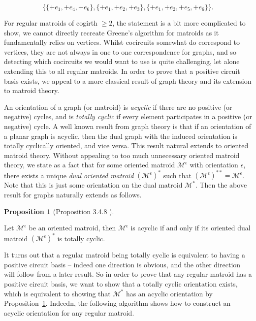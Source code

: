 \documentclass[12pt]{report}
\theoremstyle{definition}
\newtheorem{proposition}[theorem]{Proposition}
\def\calM{\mathcal M}
\theoremstyle{upright}
\begin{document}
\[\{\{+e_1, +e_4, +e_6\}, \{+e_1, +e_2, +e_3\}, \{+e_1, +e_2, +e_5, +e_6\}\}.\]

For regular matroids of cogirth $\geq2$, the statement is a bit more complicated to show, we cannot directly recreate Greene's algorithm for matroids as it fundamentally relies on vertices.
Whilst cocircuits somewhat do correspond to vertices, they are not always in one to one correspondence for graphs, and so detecting which cocircuits we would want to use is quite challenging, let alone extending this to all regular matroids.
In order to prove that a positive circuit basis exists, we appeal to a more classical result of graph theory and its extension to matroid theory.

An orientation of a graph (or matroid) is \textit{acyclic} if there are no positive (or negative) cycles, and is \textit{totally cyclic} if every element participates in a positive (or negative) cycle.
A well known result from graph theory is that if an orientation of a planar graph is acyclic, then the dual graph with the induced orientation is totally cyclically oriented, and vice versa.
This result natural extends to oriented matroid theory.
Without appealing to too much unnecessary oriented matroid theory, we state as a fact that for some oriented matroid $\calM^\epsilon$ with orientation $\epsilon$, there exists a unique \textit{dual oriented matroid} $(\calM^\epsilon)^*$ such that $(\calM^\epsilon)^{**}=\calM^\epsilon$.
Note that this is just some orientation on the dual matroid $\calM^*$.
Then the above result for graphs naturally extends as follows.

\begin{proposition}[Proposition 3.4.8 \cite{bjorner1999oriented}]\label{prop:DualCyclic}

    Let $\calM^\epsilon$ be an oriented matroid, then $\calM^\epsilon$ is acyclic if and only if its oriented dual matroid $\left(\calM^\epsilon\right)^*$ is totally cyclic.
    
\end{proposition}

It turns out that a regular matroid being totally cyclic is equivalent to having a positive circuit basis -- indeed one direction is obvious, and the other direction will follow from a later result.
So in order to prove that any regular matroid has a positive circuit basis, we want to show that a totally cyclic orientation exists, which is equivalent to showing that $\calM^*$ has an acyclic orientation by Proposition~\cref{prop:DualCyclic}.
Indeedn, the following algorithm shows how to construct an acyclic orientation for any regular matroid.
\end{document}
